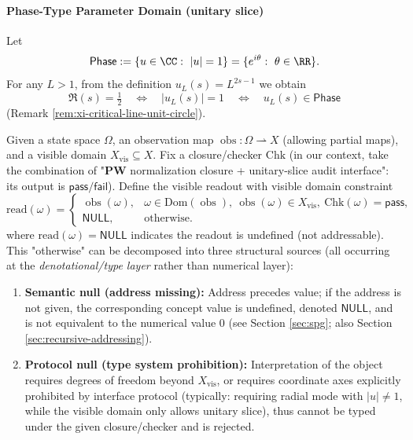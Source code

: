 \paragraph{Phase-Type Parameter Domain (unitary slice)}
Let
\[
\mathsf{Phase}:=\{u\in\CC:\ |u|=1\}=\{e^{i\theta}:\ \theta\in\RR\}.
\]
For any \(L>1\), from the definition \(u_L(s)=L^{2s-1}\) we obtain
\[
\Re(s)=\tfrac12\quad\Longleftrightarrow\quad |u_L(s)|=1\quad\Longleftrightarrow\quad u_L(s)\in \mathsf{Phase}
\]
(Remark \ref{rem:xi-critical-line-unit-circle}).

\begin{definition}\label{def:xi-visible-read-null}
Given a state space \(\Omega\), an observation map \(\operatorname{obs}:\Omega\rightharpoonup X\) (allowing partial maps), and a visible domain \(X_{\mathrm{vis}}\subseteq X\).
Fix a closure/checker \(\mathrm{Chk}\) (in our context, take the combination of "\(\mathbf{PW}\) normalization closure + unitary-slice audit interface": its output is \(\mathsf{pass}/\mathsf{fail}\)).
Define the visible readout with visible domain constraint
\[
\mathrm{read}(\omega)=
\begin{cases}
\operatorname{obs}(\omega), &
\omega\in\mathrm{Dom}(\operatorname{obs}),\ \operatorname{obs}(\omega)\in X_{\mathrm{vis}},\ \mathrm{Chk}(\omega)=\mathsf{pass},\\
\mathsf{NULL}, & \text{otherwise}.
\end{cases}
\]
where \(\mathrm{read}(\omega)=\mathsf{NULL}\) indicates the readout is undefined (not addressable).
This "otherwise" can be decomposed into three structural sources (all occurring at the \emph{denotational/type layer} rather than numerical layer):
\begin{enumerate}
  \item \textbf{Semantic null (address missing):} Address precedes value; if the address is not given, the corresponding concept value is undefined, denoted \(\mathsf{NULL}\), and is not equivalent to the numerical value \(0\) (see Section \ref{sec:spg}; also Section \ref{sec:recursive-addressing}).
  \item \textbf{Protocol null (type system prohibition):} Interpretation of the object requires degrees of freedom beyond \(X_{\mathrm{vis}}\), or requires coordinate axes explicitly prohibited by interface protocol (typically: requiring radial mode with \(|u|\neq 1\), while the visible domain only allows unitary slice), thus cannot be typed under the given closure/checker and is rejected.

\end{enumerate}
\end{definition}
